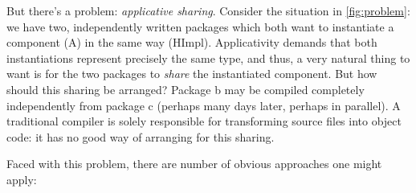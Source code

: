 But there's a problem: \emph{applicative sharing}. Consider the
situation in \cref{fig:problem}:  we have two, independently
written packages which both want to instantiate a component (A) in the
same way (HImpl).  Applicativity demands that both instantiations
represent precisely the same type, and thus, a very natural thing to
want is for the two packages to \emph{share} the instantiated component.
But how should this sharing be arranged?  Package b may be compiled
completely independently from package c (perhaps many days later,
perhaps in parallel).  A traditional compiler is solely responsible for
transforming source files into object code: it has no good way of
arranging for this sharing.

Faced with this problem, there are number of obvious approaches one
might apply:

